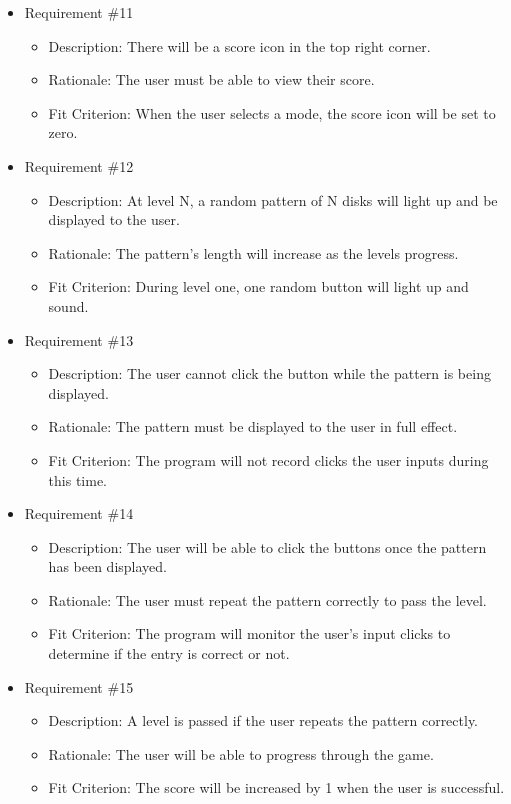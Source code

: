 \documentclass[12pt, titlepage]{article}
\begin{document}
\begin{itemize}
\item Requirement \#11
\begin{itemize}
\item Description: There will be a score icon in the top right corner.
\item Rationale: The user must be able to view their score.
\item Fit Criterion: When the user selects a mode, the score icon will be set to zero.
\end{itemize}

\item Requirement \#12
\begin{itemize}
\item Description: At level N, a random pattern of N disks will light up and be displayed to the user.
\item Rationale: The pattern's length will increase as the levels progress.
\item Fit Criterion: During level one, one random button will light up and sound.
\end{itemize}

\item Requirement \#13
\begin{itemize}
\item Description: The user cannot click the button while the pattern is being displayed. 
\item Rationale: The pattern must be displayed to the user in full effect.
\item Fit Criterion: The program will not record clicks the user inputs during this time.
\end{itemize}

\item Requirement \#14
\begin{itemize}
\item Description: The user will be able to click the buttons once the pattern has been displayed. 
\item Rationale: The user must repeat the pattern correctly to pass the level.
\item Fit Criterion: The program will monitor the user's input clicks to determine if the entry is correct or not.
\end{itemize}

\item Requirement \#15
\begin{itemize}
\item Description: A level is passed if the user repeats the pattern correctly.
\item Rationale: The user will be able to progress through the game. 
\item Fit Criterion: The score will be increased by 1 when the user is successful.
\end{itemize}


\end{itemize}
\end{document}

